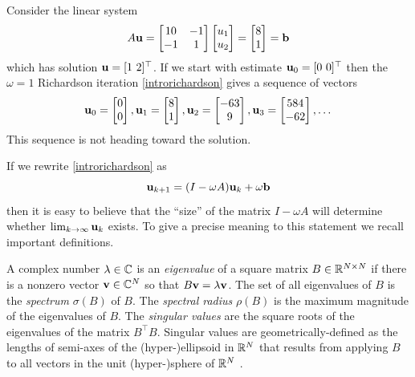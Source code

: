 \medskip\noindent\hrulefill
\begin{example} Consider the linear system
\begin{equation}
A \mathbf{u}
= \begin{bmatrix}
10 & -1 \\ -1 & 1
\end{bmatrix}
\begin{bmatrix} u_1 \\ u_2 \end{bmatrix}
= \begin{bmatrix} 8 \\ 1 \end{bmatrix}
= \mathbf{b}
 \label{introexample}
\end{equation}
which has solution $\mathbf{u} = [1\,\, 2]^\top$.  If we start with estimate $\mathbf{u}_0 = [0\,\, 0]^\top$ then the $\omega=1$ Richardson iteration \eqref{introrichardson} gives a sequence of vectors %
\begin{equation}
{\mathbf{u}}_{0} = \begin{bmatrix} 0 \\ 0 \end{bmatrix}, {\mathbf{u}}_{1} = \begin{bmatrix} 8 \\ 1 \end{bmatrix}, {\mathbf{u}}_{2} = \begin{bmatrix} -63 \\ 9 \end{bmatrix}, {\mathbf{u}}_{3} = \begin{bmatrix} 584 \\ -62 \end{bmatrix}, \dots
\end{equation}
This sequence is not heading toward the solution.
\end{example}
\noindent\hrulefill

\medskip
If we rewrite \eqref{introrichardson} as
\begin{equation}
\mathbf{u}_{k+1} = (I - \omega A) \mathbf{u}_k + \omega \mathbf{b}  \label{introrewriterichardson}
\end{equation}
then it is easy to believe that the ``size'' of the matrix $I-\omega A$ will determine whether $\lim_{k\to\infty} \mathbf{u}_k$ exists.  To give a precise meaning to this statement we recall important definitions.

A complex number $\lambda \in \mathbb{C}$ is an \emph{eigenvalue} of a square matrix $B\in\mathbb{R}^{N\times N}$ if there is a nonzero vector $\mathbf{v}\in\mathbb{C}^N$ so that $B \mathbf{v} = \lambda \mathbf{v}$.  The set of all eigenvalues of $B$ is the \emph{spectrum} $\sigma(B)$ of $B$.  The \emph{spectral radius} $\rho(B)$ is the maximum magnitude of the eigenvalues of $B$.  The \emph{singular values} are the square roots of the eigenvalues of the matrix $B^\top B$.  Singular values are geometrically-defined as the lengths of semi-axes of the (hyper-)ellipsoid in $\mathbb{R}^N$ that results from applying $B$ to all vectors in the unit (hyper-)sphere of $\mathbb{R}^N$ \citep{TrefethenBau1997}.

